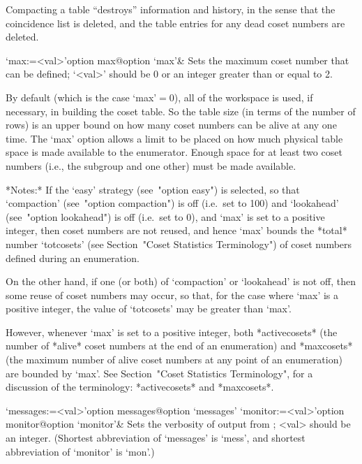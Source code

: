 Compacting a table ``destroys'' information and history, in the  sense
that the coincidence list is deleted, and the table  entries  for  any
dead coset numbers are deleted.

\>`max:=<val>'{option max}@{option `max'}&
Sets the maximum coset number that can be defined;
`<val>' should be $0$ or an integer greater than or equal to 2.

By default (which is the case `max'${}=0$), all of  the  workspace  is
used, if necessary, in building the coset table. So the table size (in
terms of the number of rows) is an  upper  bound  on  how  many  coset
numbers can be alive at any one time. The `max' option allows a  limit
to be placed on how much physical table space is made available to the
enumerator. Enough space for at least two  coset  numbers  (i.e.,  the
subgroup and one other) must be made available.

*Notes:*
If the `easy'  strategy  (see~"option  easy")  is  selected,  so  that
`compaction' (see~"option compaction") is off (i.e.~set  to  100)  and
`lookahead' (see~"option lookahead") is off (i.e.~set to 0), and `max'
is set to a positive integer, then coset numbers are not  reused,  and
hence `max' bounds the *total* number `totcosets' (see  Section~"Coset
Statistics  Terminology")  of  coset   numbers   defined   during   an
enumeration.

On the other hand, if one (or both) of `compaction' or `lookahead'  is
not off, then some reuse of coset numbers may occur, so that, for  the
case where `max' is a positive integer, the value of  `totcosets'  may
be greater than `max'.

However,  whenever  `max'  is  set  to  a   positive   integer,   both
*activecosets* (the number of *alive* coset numbers at the end  of  an
enumeration) and  *maxcosets*  (the  maximum  number  of  alive  coset
numbers at any point of an enumeration)  are  bounded  by  `max'.  See
Section~"Coset  Statistics  Terminology",  for  a  discussion  of  the
terminology: *activecosets* and *maxcosets*.

\enditems


\beginitems

\>`messages:=<val>'{option messages}@{option `messages'}
\>`monitor:=<val>'{option monitor}@{option `monitor'}&
Sets the verbosity of output from {\ACE}; <val> should be an integer.
(Shortest  abbreviation  of  `messages'  is   `mess',   and   shortest
abbreviation of `monitor' is `mon'.)

